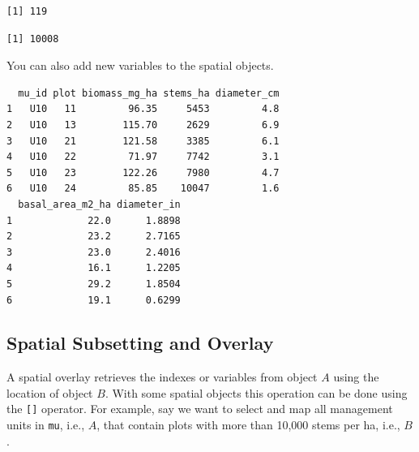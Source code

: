 \documentclass[]{krantz}
\makeatletter
\newenvironment{Shaded}{\begin{snugshade}}{\end{snugshade}}
\newcommand{\KeywordTok}[1]{\textcolor[rgb]{0.27,0.27,0.27}{\textbf{#1}}}
\newcommand{\DecValTok}[1]{\textcolor[rgb]{0.06,0.06,0.06}{#1}}
\newcommand{\FloatTok}[1]{\textcolor[rgb]{0.06,0.06,0.06}{#1}}
\newcommand{\StringTok}[1]{\textcolor[rgb]{0.5,0.5,0.5}{#1}}
\newcommand{\OperatorTok}[1]{\textcolor[rgb]{0.43,0.43,0.43}{\textbf{#1}}}
\newcommand{\ErrorTok}[1]{\textcolor[rgb]{0.14,0.14,0.14}{\textbf{#1}}}
\newcommand{\NormalTok}[1]{#1}
\newenvironment{kframe}{%
\medskip{}
\setlength{\fboxsep}{.8em}
 \def\at@end@of@kframe{}%
 \ifinner\ifhmode%
  \def\at@end@of@kframe{\end{minipage}}%
  \begin{minipage}{\columnwidth}%
 \fi\fi%
 \def\FrameCommand##1{\hskip\@totalleftmargin \hskip-\fboxsep
 \colorbox{shadecolor}{##1}\hskip-\fboxsep
     \hskip-\linewidth \hskip-\@totalleftmargin \hskip\columnwidth}%
 \MakeFramed {\advance\hsize-\width
   \@totalleftmargin\z@ \linewidth\hsize
   \@setminipage}}%
 {\par\unskip\endMakeFramed%
 \at@end@of@kframe}
\renewenvironment{Shaded}{\begin{kframe}}{\end{kframe}}
\theoremstyle{definition}
\theoremstyle{definition}
\theoremstyle{definition}
\theoremstyle{remark}
\makeatother
\begin{document}
\begin{verbatim}
[1] 119
\end{verbatim}

\begin{Shaded}
\end{Shaded}

\begin{verbatim}
[1] 10008
\end{verbatim}

You can also add new variables to the spatial objects.

\begin{Shaded}
\end{Shaded}

\begin{verbatim}
  mu_id plot biomass_mg_ha stems_ha diameter_cm
1   U10   11         96.35     5453         4.8
2   U10   13        115.70     2629         6.9
3   U10   21        121.58     3385         6.1
4   U10   22         71.97     7742         3.1
5   U10   23        122.26     7980         4.7
6   U10   24         85.85    10047         1.6
  basal_area_m2_ha diameter_in
1             22.0      1.8898
2             23.2      2.7165
3             23.0      2.4016
4             16.1      1.2205
5             29.2      1.8504
6             19.1      0.6299
\end{verbatim}

\subsection{Spatial Subsetting and
Overlay}\label{spatial-subsetting-and-overlay}

A spatial overlay retrieves the indexes or variables from object \(A\)
using the location of object \(B\). With some spatial objects this
operation can be done using the \texttt{{[}{]}} operator. For example,
say we want to select and map all management units in \texttt{mu}, i.e.,
\(A\), that contain plots with more than 10,000 stems per ha, i.e.,
\(B\).
\end{document}
